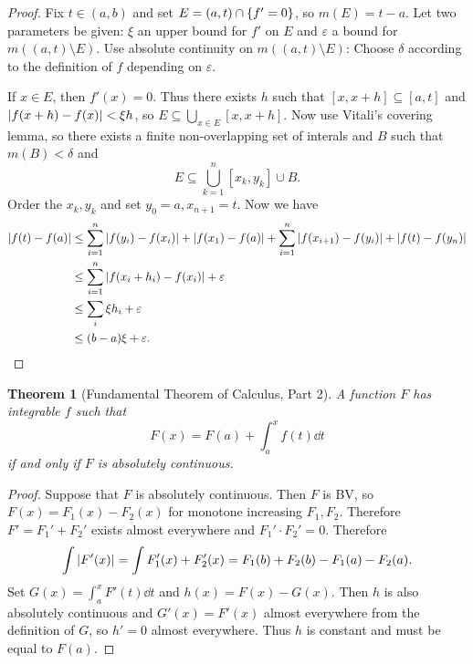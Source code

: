 \documentclass[leqno, openany]{memoir}
\newtheorem{thm}{Theorem}[chapter]
\theoremstyle{definition}
\theoremstyle{remark}
\theoremstyle{plain}
\theoremstyle{definition}
\theoremstyle{remark}
\newcommand{\ep}{\varepsilon}
\begin{document}
\begin{proof}
    Fix $t \in (a,b)$ and set $E = (a,t) \cap \qty{f' = 0}$, so $m(E) = t-a$. Let two parameters be given: $\xi$ an upper bound for $f'$ on $E$ and $\ep$ a bound for $m((a,t) \setminus E)$. Use absolute continuity on $m((a,t) \setminus E)$: Choose $\delta$ according to the definition of $f$ depending on $\ep$.

    If $x \in E$, then $f'(x) = 0$. Thus there exists $h$ such that $[x,x+h] \subseteq [a,t]$ and $\abs{f(x+h) - f(x)} < \xi h$, so $E \subseteq \bigcup_{x \in E} [x,x+h]$. Now use Vitali's covering lemma, so there exists a finite non-overlapping set of interals and $B$ such that $m(B) < \delta$ and
    \[ E \subseteq \bigcup_{k=1}^n [x_k,y_k] \cup B. \]
    Order the $x_k,y_k$ and set $y_0 = a, x_{n+1} = t$. Now we have
    \begin{align*}
        \abs{f(t) - f(a)} &\leq \sum_{i=1}^n \abs{f(y_i) - f(x_i)} + \abs{f(x_1) - f(a)} + \sum_{i=1}^n \abs{f(x_{i+1}) - f(y_i)} + \abs{f(t) - f(y_n)} \\
                          &\leq \sum_{i=1}^n \abs{f(x_i + h_i) - f(x_i)} + \ep \\
                          &\leq \sum_i \xi h_i + \ep \\
                          &\leq (b-a) \xi + \ep. \qedhere
    \end{align*}
\end{proof}

\begin{thm}[Fundamental Theorem of Calculus, Part 2]
    A function $F$ has integrable $f$ such that 
    \[ F(x) = F(a) + \int_a^x f(t) \dd{t} \]
    if and only if $F$ is absolutely continuous.
\end{thm}

\begin{proof}
    Suppose that $F$ is absolutely continuous. Then $F$ is BV, so $F(x) = F_1(x) - F_2(x)$ for monotone increasing $F_1, F_2$. Therefore $F' = F_1' + F_2'$ exists almost everywhere and $F_1' \cdot F_2' = 0$. Therefore
    \[ \int \abs{F'(x)} = \int F_1'(x) + F_2'(x) = F_1(b) + F_2(b) - F_1(a) - F_2(a). \]
    Set $G(x) = \int_a^x F'(t) \dd{t}$ and $h(x) = F(x) - G(x)$. Then $h$ is also absolutely continuous and $G'(x) = F'(x)$ almost everywhere from the definition of $G$, so $h' = 0$ almost everywhere. Thus $h$ is constant and must be equal to $F(a)$.
\end{proof}
\end{document}
